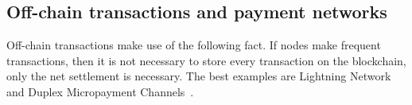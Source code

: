 

\subsection{Off-chain transactions and payment networks}
Off-chain transactions make use of the following fact.
If nodes make frequent transactions,
then it is not necessary to store every transaction on the blockchain,
only the net settlement is necessary.
The best examples are Lightning Network~\cite{lightningnetwork} and Duplex Micropayment Channels~\cite{decker2015fast}.


